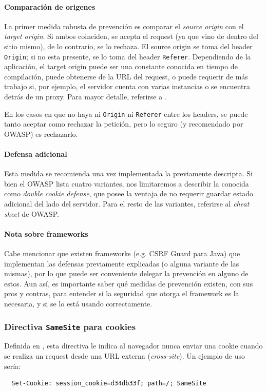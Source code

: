 \documentclass{article}
\theoremstyle{definition}
\begin{document}
\paragraph{Comparación de origenes} La primer medida robusta de
prevención es comparar el \textit{source origin} con el \textit{target origin}.
Si ambos coinciden, se acepta el request (ya que vino de dentro del
sitio mismo), de lo contrario, se lo rechaza.
El source origin se toma del header \verb+Origin+; si no esta presente, se lo
toma del header \verb+Referer+.
Dependiendo de la aplicación, el target origin puede ser una constante conocida
en tiempo de compilación, puede obtenerse de la URL del request, o puede
requerir de más trabajo si, por ejemplo, el servidor cuenta con varias
instancias o se encuentra detrás de un proxy. Para mayor detalle, referirse a
\cite{owasp}.

En los casos en que no haya ni \verb+Origin+ ni \verb+Referer+ entre los
headers, se puede tanto aceptar como rechazar la petición, pero lo seguro (y
recomendado por OWASP) es rechazarlo.

\paragraph{Defensa adicional} Esta medida se recomienda una vez implementada la
previamente descripta. Si bien el OWASP lista cuatro variantes, nos limitaremos
a describir la conocida como \textit{double cookie defense}, que posee la
ventaja de no requerir guardar estado adicional del lado del servidor. Para el
resto de las variantes, referirse al \textit{cheat sheet} de OWASP.

\paragraph{Nota sobre frameworks} Cabe mencionar que existen frameworks (e.g.
CSRF Guard para Java) que implementan las defensas previamente explicadas (o
alguna variante de las mismas), por lo que puede ser conveniente delegar la
prevención en alguno de estos. Aun así, es importante saber qué medidas de
prevención existen, con sus pros y contras, para entender si la seguridad que
otorga el framework es la necesaria, y si se lo está usando correctamente.

\subsubsection{Directiva \texttt{SameSite} para cookies}
Definida en \cite{ietf}, esta directiva le indica al navegador nunca enviar una cookie cuando se realiza
un request desde una URL externa (\textit{cross-site}). Un ejemplo de uso sería:
\begin{verbatim}
  Set-Cookie: session_cookie=d34db33f; path=/; SameSite
\end{verbatim}
\end{document}
